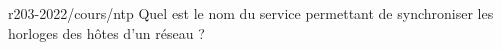 \begin{question}{r203-2022/cours/ntp}
  Quel est le nom du service permettant de synchroniser les horloges
  des hôtes d'un réseau ?
  \begin{reponses}
  \end{reponses}
\end{question}
